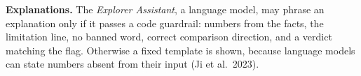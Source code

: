 \textbf{Explanations.} The \emph{Explorer Assistant}, a language model, may phrase an
explanation only if it passes a code guardrail: numbers from the facts, the limitation line, no banned word, correct
comparison direction, and a verdict matching the flag. Otherwise a fixed template is shown, because language models
can state numbers absent from their input (Ji et al.\ 2023).
